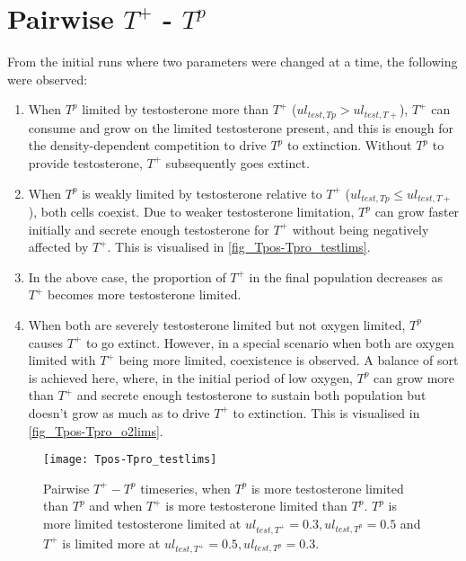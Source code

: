 \section{Pairwise $T^+$ - $T^p$}
From the initial runs where two parameters were changed at a time, the following were observed:
\begin{enumerate}
    \item When $T^p$ limited by testosterone more than $T^+$ ($ul_{test,Tp} > ul_{test,T+}$), $T^+$ can consume and grow on the limited testosterone present, and this is enough for the density-dependent competition to drive $T^p$ to extinction. Without $T^p$ to provide testosterone, $T^+$ subsequently goes extinct.
    \item When $T^p$ is weakly limited by testosterone relative to $T^+$ ($ul_{test,Tp} \leq ul_{test,T+}$), both cells coexist. Due to weaker testosterone limitation, $T^p$ can grow faster initially and secrete enough testosterone for $T^+$ without being negatively affected by $T^+$. This is visualised in \autoref{fig_Tpos-Tpro_testlims}.
    \item In the above case, the proportion of $T^+$ in the final population decreases as $T^+$ becomes more testosterone limited.
    \item When both are severely testosterone limited but not oxygen limited, $T^p$ causes $T^+$ to go extinct. However, in a special scenario when both are oxygen limited with $T^+$ being more limited, coexistence is observed. A balance of sort is achieved here, where, in the initial period of low oxygen, $T^p$ can grow more than $T^+$ and secrete enough testosterone to sustain both population but doesn't grow as much as to drive $T^+$ to extinction. This is visualised in \autoref{fig_Tpos-Tpro_o2lims}.
  \end{enumerate}

\begin{figure}[h!]
  \centering
  \texttt{[image: Tpos-Tpro\_testlims]}
  \caption[Pairwise $T^+ - T^p$ timeseries, testosterone limitation]{Pairwise $T^+ - T^p$ timeseries, when $T^p$ is more testosterone limited than $T^p$ and when $T^+$ is more testosterone limited than $T^p$. $T^p$ is more limited testosterone limited at $ul_{test,T^+}=0.3,ul_{test,T^p}=0.5$ and $T^+$ is limited more at $ul_{test,T^+}=0.5,ul_{test,T^p}=0.3$.}
  \label{fig_Tpos-Tpro_testlims}
\end{figure}

